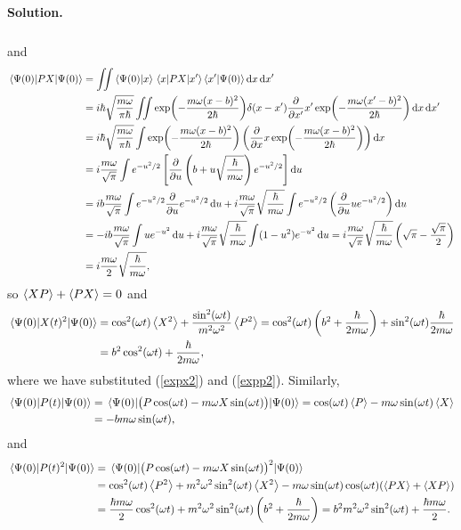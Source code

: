 \documentclass[11pt]{article}
\newcommand{\refeq}[1]{(\ref{#1})}
\newenvironment{solution}
{
    \paragraph{Solution.}
    \ignorespaces
}
{
}
\begin{document}
\begin{solution}
\begin{align}
	\end{align}
	and
	\begin{align}
		\ev{PX}{\Psio} &= \iint \braket{\Psio}{x} \mel{x}{PX}{x'} \braket{x'}{\Psio} \dd{x} \dd{x'} \\
		&= \ihb \sqrt{\frac{m \omega}{\pi \hbar}} \iint \exp(-\frac{m \omega (x - b)^2}{2 \hbar}) \delta(x - x') \pdv{}{x'} x' \exp(-\frac{m \omega (x' - b)^2}{2 \hbar}) \dd{x} \dd{x'} \\
		&= \ihb \sqrt{\frac{m \omega}{\pi \hbar}} \int \exp(-\frac{m \omega (x - b)^2}{2 \hbar}) \left( \pdv{}{x} x \exp(-\frac{m \omega (x - b)^2}{2 \hbar}) \right) \dd{x} \\
		&= i \frac{m \omega}{\sqrt{\pi}} \int e^{-u^2/2} \left[ \pdv{}{u} \left(b + u \sqrt{\frac{\hbar}{m\omega}} \right) e^{-u^2/2} \right] \dd{u} \\
		&= ib \frac{m \omega}{\sqrt{\pi}} \int e^{-u^2/2} \pdv{}{u} e^{-u^2/2} \dd{u} + i \frac{m \omega}{\sqrt{\pi}} \sqrt{\frac{\hbar}{m\omega}} \int e^{-u^2/2} \left( \pdv{}{u} u e^{-u^2/2} \right) \dd{u} \\
		&= -ib \frac{m \omega}{\sqrt{\pi}} \int u e^{-u^2} \dd{u} + i \frac{m \omega}{\sqrt{\pi}} \sqrt{\frac{\hbar}{m\omega}} \int (1 - u^2) e^{-u^2} \dd{u} = i \frac{m \omega}{\sqrt{\pi}} \sqrt{\frac{\hbar}{m\omega}} \left( \sqrt{\pi} - \frac{\sqrt{\pi}}{2} \right) \\
		&= i \frac{m\omega}{2} \sqrt{\frac{\hbar}{m\omega}},
	\end{align}
	so $\ev{XP} + \ev{PX} = 0$ and
	\begin{align}
		\ev{\Xt^2}{\Psio} &= \cosqwt \ev{X^2} + \frac{\sinqwt}{m^2 \omega^2} \ev{P^2} = \cosqwt \left( b^2 + \frac{\hbar}{2 m \omega} \right) + \sinqwt \frac{\hbar}{2 m \omega} \\
		&= b^2 \cosqwt + \frac{\hbar}{2 m \omega}, \label{exX2}
	\end{align}
	where we have substituted \refeq{expx2} and \refeq{expp2}.  Similarly,
	\begin{align}
		\ev{\Pt}{\Psio} &= \ev{\big( P \coswt - m \omega X \sinwt \big)}{\Psio} = \coswt \ev{P} - m \omega \sinwt \ev{X} \\
		&= -b m \omega \sinwt, \label{exP}
	\end{align}
	and
	\begin{align}
		\ev{\Pt^2}{\Psio} &= \ev{\big( P \coswt - m \omega X \sinwt \big)^2}{\Psio} \\
		&= \cosqwt \ev{P^2} + m^2 \omega^2 \sinqwt \ev{X^2} - m \omega \sinwt \coswt (\ev{PX} + \ev{XP}) \\
		&= \frac{\hbar m \omega}{2} \cosqwt + m^2 \omega^2 \sinqwt \left( b^2 + \frac{\hbar}{2 m \omega} \right) = b^2 m^2 \omega^2 \sinqwt + \frac{\hbar m \omega}{2}. \label{exP2}
	\end{align}
	

\end{solution}
\end{document}
